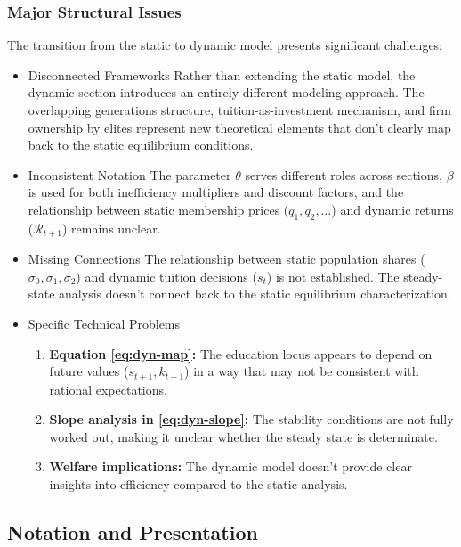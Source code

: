 \documentclass[12pt,letterpaper]{article}
\begin{document}
\subsubsection{Major Structural Issues}

The transition from the static to dynamic model presents significant challenges:

\begin{itemize}
	\item Disconnected Frameworks
	Rather than extending the static model, the dynamic section introduces an entirely different modeling approach. The overlapping generations structure, tuition-as-investment mechanism, and firm ownership by elites represent new theoretical elements that don't clearly map back to the static equilibrium conditions.

	\item Inconsistent Notation
The parameter $\theta$ serves different roles across sections, $\beta$ is used for both inefficiency multipliers and discount factors, and the relationship between static membership prices ($q_1, q_2, \ldots$) and dynamic returns ($\mathcal{R}_{t+1}$) remains unclear.

\item Missing Connections
The relationship between static population shares ($\sigma_0, \sigma_1, \sigma_2$) and dynamic tuition decisions ($s_t$) is not established. The steady-state analysis doesn't connect back to the static equilibrium characterization.


\item Specific Technical Problems

\begin{enumerate}
	\item \textbf{Equation \eqref{eq:dyn-map}:} The education locus appears to depend on future values ($s_{t+1}, k_{t+1}$) in a way that may not be consistent with rational expectations.
	
	\item \textbf{Slope analysis in \eqref{eq:dyn-slope}:} The stability conditions are not fully worked out, making it unclear whether the steady state is determinate.
	
	\item \textbf{Welfare implications:} The dynamic model doesn't provide clear insights into efficiency compared to the static analysis.
\end{enumerate}
\end{itemize}

\subsection{Notation and Presentation}
\end{document}
